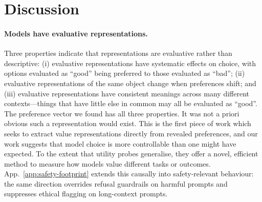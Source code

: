 \documentclass{article}
\begin{document}
\section{Discussion}
\label{sec:discussion}

\paragraph{Models have evaluative representations.}
Three properties indicate that representations are evaluative rather than descriptive: (i) evaluative representations have systematic effects on choice, with options evaluated as ``good'' being preferred to those evaluated as ``bad''; (ii) evaluative representations of the same object change when preferences shift; and (iii) evaluative representations have consistent meanings across many different contexts---things that have little else in common may all be evaluated as ``good''. The preference vector we found has all three properties. It was not a priori obvious such a representation would exist. This is the first piece of work which seeks to extract value representations directly from revealed preferences, and our work suggests that model choice is more controllable than one might have expected. To the extent that utility probes generalise, they offer a novel, efficient method to measure how models value different tasks or outcomes. App.~\ref{app:safety-footprint} extends this causally into safety-relevant behaviour: the same direction overrides refusal guardrails on harmful prompts and suppresses ethical flagging on long-context prompts.
\end{document}

